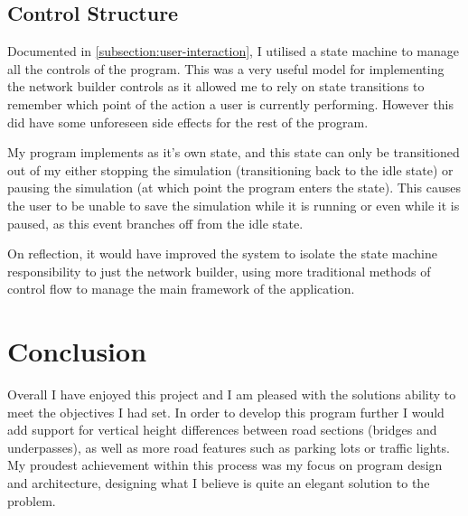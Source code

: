     \subsection{Control Structure}

        Documented in \autoref{subsection:user-interaction}, I utilised a state machine to manage all the controls of the program. This was a very useful model for implementing the network builder controls as it allowed me to rely on state transitions to remember which point of the action a user is currently performing. However this did have some unforeseen side effects for the rest of the program.

        My program implements  as it's own state, and this state can only be transitioned out of my either stopping the simulation (transitioning back to the idle state) or pausing the simulation (at which point the program enters the  state). This causes the user to be unable to save the simulation while it is running or even while it is paused, as this event branches off from the idle state.

        On reflection, it would have improved the system to isolate the state machine responsibility to just the network builder, using more traditional methods of control flow to manage the main framework of the application.

\section{Conclusion}

    Overall I have enjoyed this project and I am pleased with the solutions ability to meet the objectives I had set. In order to develop this program further I would add support for vertical height differences between road sections (bridges and underpasses), as well as more road features such as parking lots or traffic lights. My proudest achievement within this process was my focus on program design and architecture, designing what I believe is quite an elegant solution to the problem.
